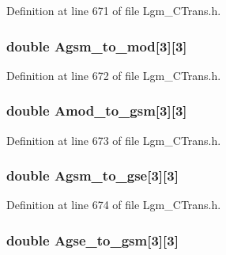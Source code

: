 Definition at line 671 of file Lgm\_\-CTrans.h.\hypertarget{struct_lgm___c_trans_35b300d0ecae5fa95f9a161a04a76c68}{
\subsubsection[{Agsm\_\-to\_\-mod}]{\setlength{\rightskip}{0pt plus 5cm}double {\bf Agsm\_\-to\_\-mod}\mbox{[}3\mbox{]}\mbox{[}3\mbox{]}}}
\label{struct_lgm___c_trans_35b300d0ecae5fa95f9a161a04a76c68}




Definition at line 672 of file Lgm\_\-CTrans.h.\hypertarget{struct_lgm___c_trans_44ebaf4525593898cbabcea6c05cad3e}{
\subsubsection[{Amod\_\-to\_\-gsm}]{\setlength{\rightskip}{0pt plus 5cm}double {\bf Amod\_\-to\_\-gsm}\mbox{[}3\mbox{]}\mbox{[}3\mbox{]}}}
\label{struct_lgm___c_trans_44ebaf4525593898cbabcea6c05cad3e}




Definition at line 673 of file Lgm\_\-CTrans.h.\hypertarget{struct_lgm___c_trans_37da7699c286f0a4542396aaab17bb36}{
\subsubsection[{Agsm\_\-to\_\-gse}]{\setlength{\rightskip}{0pt plus 5cm}double {\bf Agsm\_\-to\_\-gse}\mbox{[}3\mbox{]}\mbox{[}3\mbox{]}}}
\label{struct_lgm___c_trans_37da7699c286f0a4542396aaab17bb36}




Definition at line 674 of file Lgm\_\-CTrans.h.\hypertarget{struct_lgm___c_trans_568504cf16f5e31c68e955235b19f883}{
\subsubsection[{Agse\_\-to\_\-gsm}]{\setlength{\rightskip}{0pt plus 5cm}double {\bf Agse\_\-to\_\-gsm}\mbox{[}3\mbox{]}\mbox{[}3\mbox{]}}}
\label{struct_lgm___c_trans_568504cf16f5e31c68e955235b19f883}





